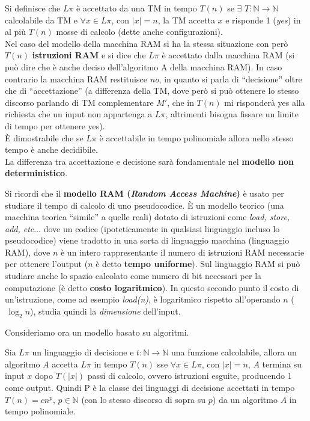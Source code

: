 \documentclass[a4paper,12pt, oneside]{book}
\begin{document}
\begin{definizione}
  Si definisce che $L\pi$ è accettato da una TM in tempo $T(n)$ se $\exists
  \,\,T :\mathbb{N}\to \mathbb{N}$ calcolabile da TM e $\forall x\in L\pi$, con
  $|x|=n$, la TM accetta $x$ e risponde 1 (\textit{yes}) in al più $T(n)$ mosse
  di calcolo (dette anche configurazioni).\\
  Nel caso del modello della macchina RAM si ha la stessa situazione con però
  $T(n)$ \textbf{istruzioni RAM} e si dice che $L\pi$ è accettato dalla macchina
  RAM (si può dire che è anche deciso dell'algoritmo A della macchina RAM). In
  caso contrario la macchina RAM restituisce \textit{no}, in quanto si parla di
  ``decisione'' oltre che di ``accettazione'' (a differenza della TM, dove però
  si può ottenere lo stesso discorso parlando di TM complementare $M'$, che in
  $T(n)$ mi risponderà yes alla richiesta che un input non appartenga a
  $L\pi$, altrimenti bisogna fissare un limite di tempo per ottenere yes).\\
  È dimostrabile che se $L\pi$ è accettabile in tempo polinomiale allora nello
  stesso tempo è anche decidibile.\\
  La differenza tra accettazione e decisione sarà fondamentale nel
  \textbf{modello non deterministico}.
\end{definizione}
\begin{shaded}
  Si ricordi che il \textbf{modello RAM (\textit{Random Access Machine})} è
  usato per studiare il tempo di calcolo di 
  uno pseudocodice. È un modello teorico (una macchina teorica ``simile'' a
  quelle reali) dotato di istruzioni come
  \textit{load, store, add, etc$\ldots$} dove un codice (ipoteticamente in
  qualsiasi linguaggio incluso lo pseudocodice) viene tradotto in una sorta di
  linguaggio macchina (linguaggio RAM), dove $n$ è un intero rappresentante il
  numero di istruzioni RAM necessarie per ottenere l'output ($n$ è detto
  \textbf{tempo uniforme}). Sul linguaggio RAM si può studiare anche lo spazio
  calcolato come numero di bit necessari per la computazione (è detto
  \textbf{costo logaritmico}). In questo secondo punto il costo di
  un'istruzione, come ad esempio \textit{load(n)}, è logaritmico rispetto
  all'operando $n$ ($\,\log_2 n$), studia quindi la \emph{dimensione}
  dell'input.
\end{shaded}
Consideriamo ora un modello basato su algoritmi.
\begin{definizione}
  Sia $L\pi$ un linguaggio di decisione e $t:\mathbb{N}\to\mathbb{N}$ una
  funzione calcolabile, allora un algoritmo $A$ accetta $L\pi$ in tempo $T(n)$
  sse $\forall x\in L\pi$, con $|x|=n$, $A$ termina su input $x$ dopo $T(|x|)$
  passi di calcolo, ovvero istruzioni esguite, producendo 1 come output. Quindi
  P è la classe dei linguaggi di decisione accettati in tempo
  $T(n)=cn^p,\,p\in\mathbb{N}$ (con lo stesso discorso di sopra su $p$) da un
  algoritmo $A$ in tempo polinomiale.
\end{definizione}
\end{document}
